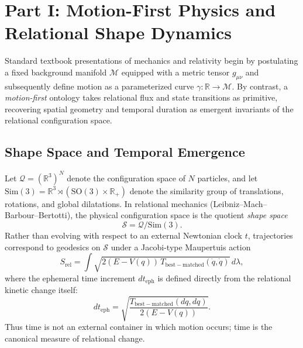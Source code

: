 \documentclass[11pt]{article}
\begin{document}
\section{Part I: Motion-First Physics and Relational Shape Dynamics}
Standard textbook presentations of mechanics and relativity begin by postulating a fixed background manifold $\mathcal{M}$ equipped with a metric tensor $g_{\mu\nu}$ and subsequently define motion as a parameterized curve $\gamma : \mathbb{R} \to \mathcal{M}$. By contrast, a \emph{motion-first} ontology takes relational flux and state transitions as primitive, recovering spatial geometry and temporal duration as emergent invariants of the relational configuration space.

\subsection{Shape Space and Temporal Emergence}
Let $\mathcal{Q} = (\mathbb{R}^3)^N$ denote the configuration space of $N$ particles, and let $\mathrm{Sim}(3) = \mathbb{R}^3 \rtimes (\mathrm{SO}(3) \times \mathbb{R}_+)$ denote the similarity group of translations, rotations, and global dilatations. In relational mechanics (Leibniz--Mach--Barbour--Bertotti), the physical configuration space is the quotient \emph{shape space}
\[
\mathcal{S} = \mathcal{Q} / \mathrm{Sim}(3).
\]
Rather than evolving with respect to an external Newtonian clock $t$, trajectories correspond to geodesics on $\mathcal{S}$ under a Jacobi-type Maupertuis action
\[
S_{\mathrm{rel}} = \int \sqrt{2(E - V(q))\, T_{\mathrm{best-matched}}(\dot{q},\dot{q})}\,d\lambda,
\]
where the ephemeral time increment $dt_{\mathrm{eph}}$ is defined directly from the relational kinetic change itself:
\[
dt_{\mathrm{eph}} = \sqrt{\frac{T_{\mathrm{best-matched}}(dq,dq)}{2(E - V(q))}}.
\]
Thus time is not an external container in which motion occurs; time is the canonical measure of relational change.
\end{document}
